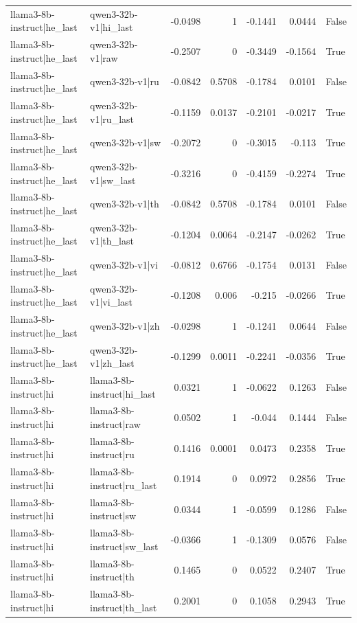 \begin{table}
\begin{tabular}{l l r r r r l}
llama3-8b-instruct|he_last & qwen3-32b-v1|hi_last & -0.0498 & 1 & -0.1441 & 0.0444 & False \\
llama3-8b-instruct|he_last & qwen3-32b-v1|raw & -0.2507 & 0 & -0.3449 & -0.1564 & True \\
llama3-8b-instruct|he_last & qwen3-32b-v1|ru & -0.0842 & 0.5708 & -0.1784 & 0.0101 & False \\
llama3-8b-instruct|he_last & qwen3-32b-v1|ru_last & -0.1159 & 0.0137 & -0.2101 & -0.0217 & True \\
llama3-8b-instruct|he_last & qwen3-32b-v1|sw & -0.2072 & 0 & -0.3015 & -0.113 & True \\
llama3-8b-instruct|he_last & qwen3-32b-v1|sw_last & -0.3216 & 0 & -0.4159 & -0.2274 & True \\
llama3-8b-instruct|he_last & qwen3-32b-v1|th & -0.0842 & 0.5708 & -0.1784 & 0.0101 & False \\
llama3-8b-instruct|he_last & qwen3-32b-v1|th_last & -0.1204 & 0.0064 & -0.2147 & -0.0262 & True \\
llama3-8b-instruct|he_last & qwen3-32b-v1|vi & -0.0812 & 0.6766 & -0.1754 & 0.0131 & False \\
llama3-8b-instruct|he_last & qwen3-32b-v1|vi_last & -0.1208 & 0.006 & -0.215 & -0.0266 & True \\
llama3-8b-instruct|he_last & qwen3-32b-v1|zh & -0.0298 & 1 & -0.1241 & 0.0644 & False \\
llama3-8b-instruct|he_last & qwen3-32b-v1|zh_last & -0.1299 & 0.0011 & -0.2241 & -0.0356 & True \\
llama3-8b-instruct|hi & llama3-8b-instruct|hi_last & 0.0321 & 1 & -0.0622 & 0.1263 & False \\
llama3-8b-instruct|hi & llama3-8b-instruct|raw & 0.0502 & 1 & -0.044 & 0.1444 & False \\
llama3-8b-instruct|hi & llama3-8b-instruct|ru & 0.1416 & 0.0001 & 0.0473 & 0.2358 & True \\
llama3-8b-instruct|hi & llama3-8b-instruct|ru_last & 0.1914 & 0 & 0.0972 & 0.2856 & True \\
llama3-8b-instruct|hi & llama3-8b-instruct|sw & 0.0344 & 1 & -0.0599 & 0.1286 & False \\
llama3-8b-instruct|hi & llama3-8b-instruct|sw_last & -0.0366 & 1 & -0.1309 & 0.0576 & False \\
llama3-8b-instruct|hi & llama3-8b-instruct|th & 0.1465 & 0 & 0.0522 & 0.2407 & True \\
llama3-8b-instruct|hi & llama3-8b-instruct|th_last & 0.2001 & 0 & 0.1058 & 0.2943 & True \\

\end{tabular}
\end{table}

